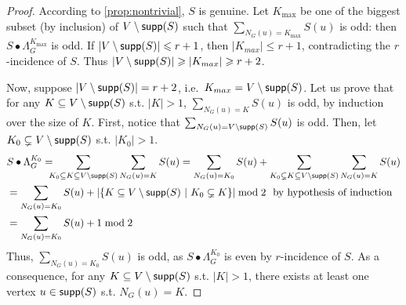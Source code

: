 \documentclass[a4paper,UKenglish,cleveref,autoref,thm-restate]{arxiv}
\newcommand{\se}{\subseteq}
\newcommand{\ls}{\leqslant}
\newcommand{\gs}{\geqslant}
\newcommand{\sm}{\setminus}
\newcommand{\supp}{\textup{\textsf{supp}}}
\begin{document}
\begin{proof}

    According to \cref{prop:nontrivial}, $S$ is genuine. Let $K_\text{max}$ be one of the biggest subset (by inclusion) of $V \sm \supp(S)$ such that $\sum_{N_{G}(u)=K_\text{max}}S(u)$ is odd: then $S \bullet\Lambda_G^{K_\text{max}}$ is odd. If $|V \sm \supp(S)| \ls r+1$, then  $|K_{max}|\ls r+1$, contradicting the $r$-incidence of $S$. Thus $|V\sm\supp(S)| \gs |K_{max}| \gs r+2$. 

    Now, suppose $|V\sm\supp(S)| = r+2$, i.e.~$K_{max}=V\sm\supp(S)$. Let us prove that for any $K \se V \sm \supp(S)$ s.t. $|K|>1$, $\sum_{N_{G}(u)=K}S(u)$ is odd, by induction over the size of $K$. First, notice that $\sum_{N_{G}(u)=V \sm \supp(S)}S(u)$ is odd.
    Then, let $K_0 \subsetneq V \sm \supp(S)$ s.t. $|K_0|>1$.
    \begin{align*}
        &S \bullet\Lambda_G^{K_0} =\!\!\!\! \sum_{K_0\se K\se V \sm \supp(S)}\sum_{N_{G}(u)=K}S(u)
        = \sum_{N_{G}(u)=K_0}S(u) + \sum_{K_0\subsetneq K\se V \sm \supp(S)}\sum_{N_{G}(u)=K}S(u)\\
        &= \sum_{N_{G}(u)=K_0}S(u) + |\{K\se V \sm \supp(S)~|~K_0 \subsetneq K\}| \bmod 2 \text{~~by hypothesis of induction}\\
        &= \sum_{N_{G}(u)=K_0}S(u) + 1 \bmod 2 
    \end{align*}
    Thus, $\sum_{N_{G}(u)=K_0}S(u)$ is odd, as $S \bullet\Lambda_G^{K_0}$ is even by $r$-incidence of $S$. As a consequence, for any $K \se V \sm \supp(S)$ s.t. $|K|>1$, there exists at least one vertex $u\in \supp(S)$ s.t. $N_{G}(u)=K$. 


\end{proof}
\end{document}
